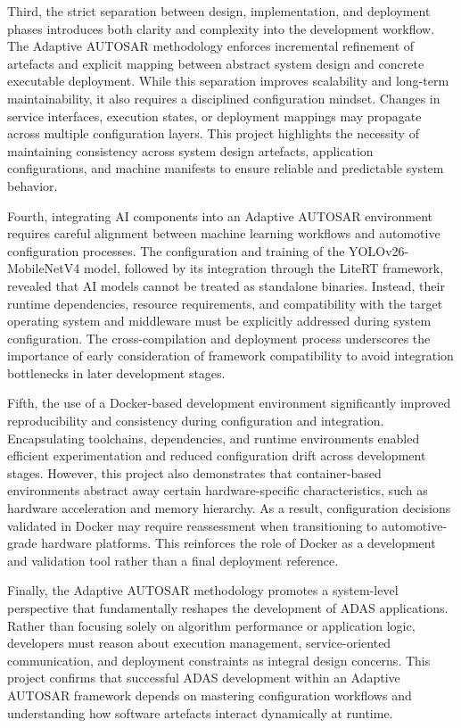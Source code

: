 Third, the strict separation between design, implementation, and deployment phases introduces both clarity and complexity into the development workflow. The Adaptive AUTOSAR methodology enforces incremental refinement of artefacts and explicit mapping between abstract system design and concrete executable deployment. While this separation improves scalability and long-term maintainability, it also requires a disciplined configuration mindset. Changes in service interfaces, execution states, or deployment mappings may propagate across multiple configuration layers. This project highlights the necessity of maintaining consistency across system design artefacts, application configurations, and machine manifests to ensure reliable and predictable system behavior.

Fourth, integrating AI components into an Adaptive AUTOSAR environment requires careful alignment between machine learning workflows and automotive configuration processes. The configuration and training of the YOLOv26-MobileNetV4 model, followed by its integration through the LiteRT framework, revealed that AI models cannot be treated as standalone binaries. Instead, their runtime dependencies, resource requirements, and compatibility with the target operating system and middleware must be explicitly addressed during system configuration. The cross-compilation and deployment process underscores the importance of early consideration of framework compatibility to avoid integration bottlenecks in later development stages.

Fifth, the use of a Docker-based development environment significantly improved reproducibility and consistency during configuration and integration. Encapsulating toolchains, dependencies, and runtime environments enabled efficient experimentation and reduced configuration drift across development stages. However, this project also demonstrates that container-based environments abstract away certain hardware-specific characteristics, such as hardware acceleration and memory hierarchy. As a result, configuration decisions validated in Docker may require reassessment when transitioning to automotive-grade hardware platforms. This reinforces the role of Docker as a development and validation tool rather than a final deployment reference.

Finally, the Adaptive AUTOSAR methodology promotes a system-level perspective that fundamentally reshapes the development of ADAS applications. Rather than focusing solely on algorithm performance or application logic, developers must reason about execution management, service-oriented communication, and deployment constraints as integral design concerns. This project confirms that successful ADAS development within an Adaptive AUTOSAR framework depends on mastering configuration workflows and understanding how software artefacts interact dynamically at runtime.

